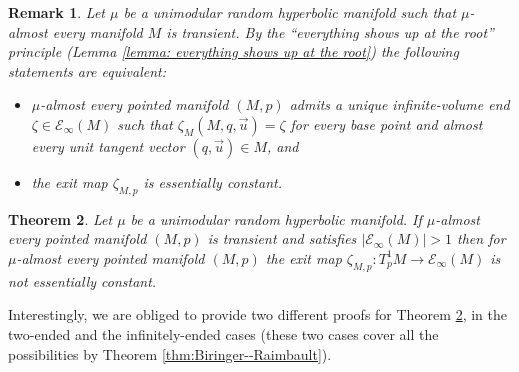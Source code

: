 \documentclass{amsart}
\newcommand{\EndsInf}[1]{\mathcal{E}_{\infty}\left(#1\right)}
\theoremstyle{plain}
\newtheorem{theorem}{Theorem}[section]
\newtheorem{remark}[theorem]{Remark}
\numberwithin{equation}{section}
\theoremstyle{definition}
\begin{document}
\begin{remark}
\label{rmk:exit map from basepoint}
Let $\mu$ be a unimodular random hyperbolic manifold such that $\mu$-almost every manifold $M$ is transient.
By the \enquote{everything shows up at the root} principle (Lemma \ref{lemma: everything shows up at the root}) the following statements are equivalent:
\begin{itemize}
\item $\mu$-almost every pointed manifold $(M,p)$  admits a unique infinite-volume end $\zeta \in \EndsInf{M}$ such that $\zeta_M(M,q,\vec u) = \zeta$ for every base point and almost every unit tangent vector $(q,\vec u) \in M$, and
\item the exit map $\zeta_{M,p}$ is essentially constant.
\end{itemize}
\end{remark}

\begin{theorem}
\label{thm:random walk does not converge to a single end}
Let $\mu$ be a unimodular random hyperbolic manifold.  If $\mu$-almost every pointed manifold $(M,p)$ is transient and  satisfies $|\EndsInf{M}| > 1$ then for $\mu$-almost every pointed manifold $(M,p)$ the exit map $\zeta_{M,p} : T^1_p M \to \EndsInf{M}$  is not essentially constant.
\end{theorem}

Interestingly, we are obliged to provide  two different proofs for Theorem \ref{thm:random walk does not converge to a single end}, in the two-ended and the infinitely-ended cases (these two cases cover  all the possibilities by Theorem \ref{thm:Biringer--Raimbault}).
\end{document}
